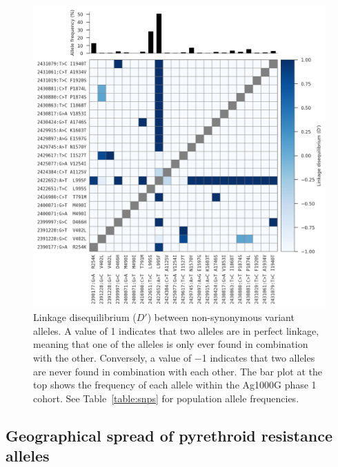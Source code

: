 \documentclass[a4paper,11pt,abstracton,hidelinks]{scrartcl}
\begin{document}
\begin{figure}[t!]
\centering
\includegraphics[width=0.9\linewidth,center]{artwork/chapter6/ld.png}
\caption{Linkage disequilibrium ($D'$) between non-synonymous variant alleles.
%
A value of 1 indicates that two alleles are in perfect linkage, meaning that one of the alleles is only ever found in combination with the other.
%
Conversely, a value of −1 indicates that two alleles are never found in combination with each other.
%
The bar plot at the top shows the frequency of each allele within the Ag1000G phase 1 cohort.
%
See Table~\ref{table:snps} for population allele frequencies.
}
\label{fig:ld}
\end{figure}


\subsection{Geographical spread of pyrethroid resistance alleles}\label{subsec:results-spread}
\end{document}
